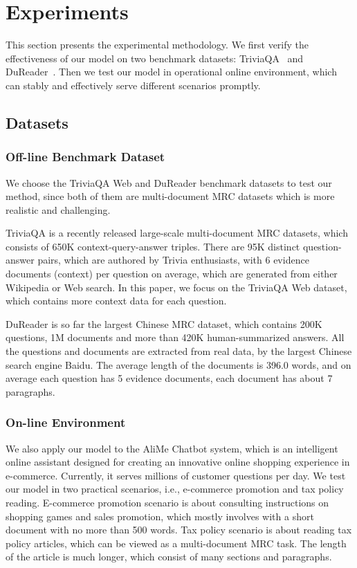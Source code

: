 \documentclass[letterpaper]{article} \usepackage{aaai19}  \usepackage{graphicx}
\begin{document}
\section{Experiments}

This section presents the experimental methodology. We first verify the effectiveness of our model on two benchmark datasets: TriviaQA~\cite{joshi2017triviaqa} and DuReader~\cite{he2017dureader}. Then we test our model in  operational online environment, which can stably and effectively serve different scenarios promptly. 



\subsection{Datasets}

\subsubsection{Off-line Benchmark Dataset}
We choose the TriviaQA Web and DuReader benchmark datasets to test our method, since both of them are multi-document MRC datasets which is more realistic and challenging. 


TriviaQA is a recently released large-scale multi-document MRC datasets, which consists of 650K context-query-answer triples. There are 95K distinct question-answer pairs, which are 
authored by Trivia enthusiasts, with 6 evidence documents (context) per question on average, which are generated from either Wikipedia or Web search. In this paper, we focus on the TriviaQA Web dataset, which contains more context data for each question. 


DuReader is so far the largest Chinese MRC dataset, which contains 200K questions, 1M documents and more than  420K human-summarized answers. All the questions and documents are extracted from real data, by the largest Chinese search engine Baidu. The average length of the documents is 396.0 words, and on average each question has 5 evidence documents, each document has about 7 paragraphs.

\subsubsection{On-line Environment}
We also apply our model to the AliMe Chatbot system, which is an intelligent online assistant designed for creating an innovative online shopping experience in e-commerce. Currently, it serves millions of customer questions per day. We test our model in two practical scenarios, i.e., e-commerce promotion and tax policy reading. E-commerce promotion scenario is about consulting instructions on shopping games and sales promotion, which mostly involves with a short document with no more than 500 words. Tax policy scenario is about reading tax policy articles, which can be viewed as a multi-document MRC task. The length of the article is much longer, which consist of many sections and paragraphs.  
\end{document}
